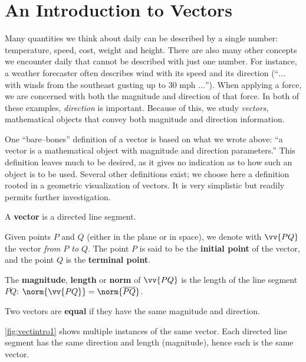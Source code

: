 \section{An Introduction to Vectors}\label{sec:vector_intro}

Many quantities we think about daily can be described by a single number: temperature, speed, cost, weight and height. There are also many other concepts we encounter daily that cannot be described with just one number. For instance, a weather forecaster often describes wind with its speed and its direction (``$\ldots$ with winds from the southeast gusting up to 30 mph $\ldots$''). When applying a force, we are concerned with both the magnitude and direction of that force. In both of these examples, \textit{direction} is important. Because of this, we study \textit{vectors}, mathematical objects that convey both magnitude and direction information.\bigskip

One ``bare--bones'' definition of a vector is based on what we wrote above: ``a vector is a mathematical object with magnitude and direction parameters.'' This definition leaves much to be desired, as it gives no indication as to how such an object is to be used. Several other definitions exist; we choose here a definition rooted in a geometric visualization of vectors. It is very simplistic but readily permits further investigation.


{A \textbf{vector} is a directed line segment.\bigskip

Given points $P$ and $Q$ (either in the plane or in space), we denote with $\vv{PQ}$ the vector \textit{from $P$ to $Q$}. The point $P$ is said to be the \textbf{initial point} of the vector, and the point $Q$ is the \textbf{terminal point}. \bigskip

The \textbf{magnitude}, \textbf{length} or \textbf{norm} of $\vv{PQ}$ is the length of the line segment $\overline{PQ}$: $\norm{\vv{PQ}} = \norm{\overline{PQ}}$.\bigskip

Two vectors are \textbf{equal} if they have the same magnitude and direction.
}

\autoref{fig:vectintro1} shows multiple instances of the same vector. Each directed line segment has the same direction and length (magnitude), hence each is the same vector.

